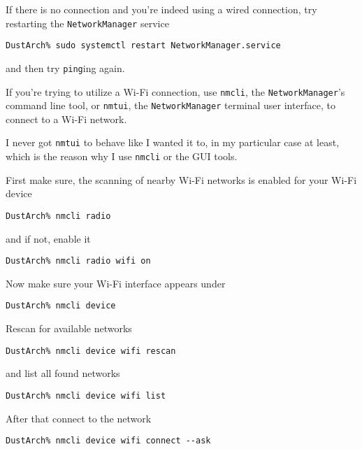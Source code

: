 \documentclass[9pt]{report}
\newenvironment{NOTE}
{\begin{tcolorbox}[colback=admonitionBG,coltitle=draculaFG,colframe=draculaBlue,colbacktitle=draculaBlue,title=NOTE]}
{\end{tcolorbox}}
\begin{document}
If there is no connection and you’re indeed using a wired connection, try restarting the \texttt{NetworkManager} service


\begin{verbatim}
DustArch% sudo systemctl restart NetworkManager.service
\end{verbatim}

and then try \texttt{ping}ing again.


If you’re trying to utilize a Wi-Fi connection, use \texttt{nmcli}, the \texttt{NetworkManager}'s command line tool, or \texttt{nmtui}, the \texttt{NetworkManager} terminal user interface, to connect to a Wi-Fi network.


\begin{NOTE}
    I never got \texttt{nmtui} to behave like I wanted it to, in my particular case at least, which is the reason why I use \texttt{nmcli} or the GUI tools.

\end{NOTE}
First make sure, the scanning of nearby Wi-Fi networks is enabled for your Wi-Fi device


\begin{verbatim}
DustArch% nmcli radio
\end{verbatim}

and if not, enable it


\begin{verbatim}
DustArch% nmcli radio wifi on
\end{verbatim}

Now make sure your Wi-Fi interface appears under


\begin{verbatim}
DustArch% nmcli device
\end{verbatim}

Rescan for available networks


\begin{verbatim}
DustArch% nmcli device wifi rescan
\end{verbatim}

and list all found networks


\begin{verbatim}
DustArch% nmcli device wifi list
\end{verbatim}

After that connect to the network


\begin{verbatim}
DustArch% nmcli device wifi connect --ask
\end{verbatim}
\end{document}
